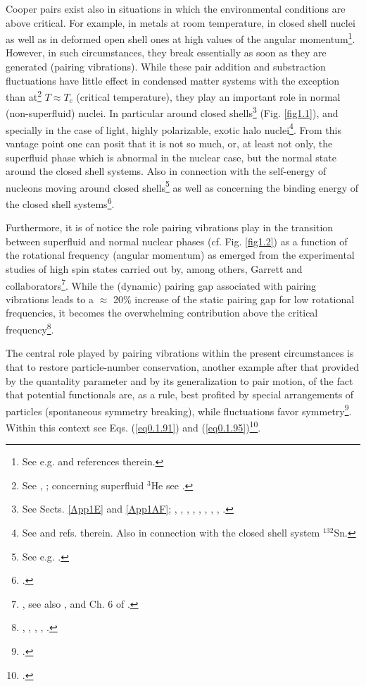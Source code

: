  Cooper pairs exist also in situations in which the environmental conditions are above critical. For example, in metals at room temperature, in closed shell nuclei as well as in deformed open shell ones at high values of the angular momentum\footnote{See e.g. \cite{Shimizu:90} and references therein.}. However, in such circumstances, they break essentially as soon as they are generated (pairing vibrations). While these pair addition and substraction fluctuations have little effect in condensed matter systems with the exception than at\footnote{See \cite{Schmidt:68}, \cite{Schmid:69} \cite{Abrahams:68}; concerning superfluid $^3$He see \cite{Wolfe:78}.} $T\approx T_c$ (critical temperature), they play an important role in normal (non-superfluid) nuclei. In particular around  closed shells\footnote{See Sects. \ref{App1E} and \ref{App1AF}; \cite{Bohr:64}, \cite{Bes:66}, \cite{Hogassen:61}, \cite{Schmidt:72}, \cite{Schmidt:68}, \cite{Barranco:01}, \cite{Potel:13}, \cite{Potel:14}, \cite{Schmidt:64}.} (Fig. \ref{fig1.1}), and specially in the case of light, highly polarizable, exotic halo nuclei\footnote{See \cite{Potel:13} and refs. therein. Also \cite{Potel:13b} in connection with the closed shell system $^{132}$Sn.}. From this vantage point one can posit that it is not so much, or, at least not only, the superfluid phase which is abnormal in the nuclear case, but the normal state around the closed shell systems. Also in connection with the self-energy of nucleons moving around closed shells\footnote{See e.g. \cite{Bes:71,Flynn:71}.} as well as concerning the binding energy of the closed shell systems\footnote{\cite{Baroni:04}.}.
 
 
  Furthermore, it is of notice the role pairing vibrations play in the  transition between superfluid and normal nuclear phases (cf. Fig. \ref{fig1.2}) as a function of the rotational frequency (angular momentum) as emerged from the experimental studies of high spin states carried out by, among others, Garrett and collaborators\footnote{\cite{Garrett:85,Garrett:86}, see also \cite{Shimizu:89}, \cite{Barranco:87b} and Ch. 6 of \cite{Brink:05}.}.
 While the (dynamic) pairing gap associated with pairing vibrations leads to a $\approx$ 20\% increase of the static pairing gap for low rotational frequencies, it becomes the overwhelming contribution above the critical frequency\footnote{\cite{Shimizu:89}, \cite{Shimizu:90}, \cite{Shimizu:13},  \cite{Donau:99}, \cite{Shimizu:00}.}.
 
 
 
  The central role played by pairing vibrations within the present circumstances is that to restore particle-number conservation, another example after that provided by the quantality parameter and by its generalization to pair motion, of the fact that potential functionals are, as a rule, best profited by special arrangements of particles (spontaneous symmetry breaking), while fluctuations favor symmetry\footnote{\cite{Anderson:84,Anderson:76}.}. Within this context see Eqs. (\ref{eq0.1.91}) and (\ref{eq0.1.95})\footnote{\cite{Shimizu:13}.}.
  
